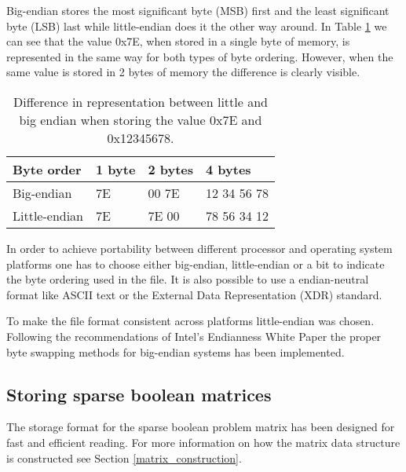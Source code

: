Big-endian stores the most significant byte (MSB) first and the least significant byte (LSB) last while little-endian does it the other way around.
In Table \ref{tab:endian} we can see that the value 0x7E, when stored in a single byte of memory, is represented in the same way for both types of byte ordering.
However, when the same value is stored in 2 bytes of memory the difference is clearly visible.


\begin{table}[htbp]
	\centering
	\begin{tabular}{|l||l|l||l|}
		\hline
		\bf Byte order & \bf 1 byte & \bf 2 bytes & \bf 4 bytes \\ \hline
		Big-endian    & 7E & 00 7E & 12 34 56 78 \\ \hline
		Little-endian & 7E & 7E 00 & 78 56 34 12 \\ \hline
	\end{tabular}
	\caption{Difference in representation between little and big endian when storing the value 0x7E and 0x12345678.}
	\label{tab:endian}
\end{table}

In order to achieve portability between different processor and operating system platforms one has to choose either big-endian, little-endian or a bit to indicate the byte ordering used in the file.
It is also possible to use a endian-neutral format like ASCII text or the External Data Representation (XDR) \cite{RFC4506} standard.

To make the file format consistent across platforms little-endian was chosen.
Following the recommendations of Intel's Endianness White Paper \cite{intel-endian} the proper byte swapping methods for big-endian systems has been implemented.




\subsection{Storing sparse boolean matrices}

The storage format for the sparse boolean problem matrix has been designed for fast and efficient reading.
For more information on how the matrix data structure is constructed see Section \ref{matrix_construction}.



